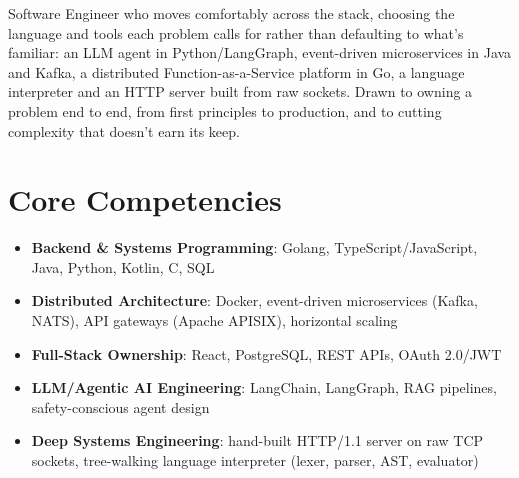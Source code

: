 \documentclass[11pt,a4paper,sans]{moderncv}
\begin{document}
\makecvtitle


\vspace{6pt}
\small{Software Engineer who moves comfortably across the stack, choosing the language and tools each problem calls for rather than defaulting to what's familiar: an LLM agent in Python/LangGraph, event-driven microservices in Java and Kafka, a distributed Function-as-a-Service platform in Go, a language interpreter and an HTTP server built from raw sockets. Drawn to owning a problem end to end, from first principles to production, and to cutting complexity that doesn't earn its keep.}


\section{Core Competencies}
\vspace{1pt}
\begin{itemize}

\item \textbf{Backend \& Systems Programming}: Golang, TypeScript/JavaScript, Java, Python, Kotlin, C, SQL

\item \textbf{Distributed Architecture}: Docker, event-driven microservices (Kafka, NATS), API gateways (Apache APISIX), horizontal scaling

\item \textbf{Full-Stack Ownership}: React, PostgreSQL, REST APIs, OAuth 2.0/JWT

\item \textbf{LLM/Agentic AI Engineering}: LangChain, LangGraph, RAG pipelines, safety-conscious agent design

\item \textbf{Deep Systems Engineering}: hand-built HTTP/1.1 server on raw TCP sockets, tree-walking language interpreter (lexer, parser, AST, evaluator)

\end{itemize}

\end{document}
